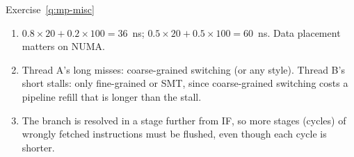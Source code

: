 \begin{noot}{Exercise~\ref{q:mp-misc}}
\begin{enumerate}[label=(\alph*),leftmargin=*]
  \item $0.8\times20+0.2\times100=36$~ns; $0.5\times20+0.5\times100=60$~ns. Data
  placement matters on NUMA.
  \item Thread A's long misses: coarse-grained switching (or any style). Thread B's
  short stalls: only fine-grained or SMT, since coarse-grained switching costs a
  pipeline refill that is longer than the stall.
  \item The branch is resolved in a stage further from IF, so more stages (cycles)
  of wrongly fetched instructions must be flushed, even though each cycle is
  shorter.
\end{enumerate}
\end{noot}

